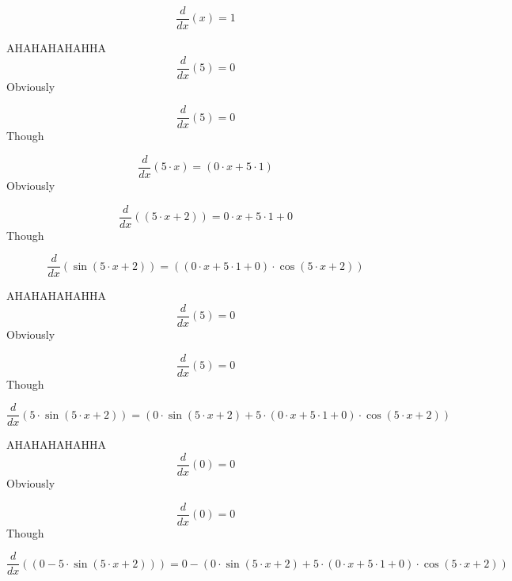 \documentclass[12pt,a4paper]{extreport}
\begin{document}
\begin{dmath*}
    \frac{d}{dx} \left(x\right) = 1
\end{dmath*}

AHAHAHAHAHHA
\begin{dmath*}
    \frac{d}{dx}\left(5\right) =  0 
\end{dmath*}
Obviously


\begin{dmath*}
    \frac{d}{dx} \left(5\right) = 0
\end{dmath*}
Though


\begin{dmath*}
    \frac{d}{dx} \left(5\cdot x\right) = \left(0\cdot x+5\cdot 1\right)
\end{dmath*}
Obviously


\begin{dmath*}
    \frac{d}{dx} \left(\left(5\cdot x+2\right)\right) = 0\cdot x+5\cdot 1+0
\end{dmath*}
Though


\begin{dmath*}
    \frac{d}{dx} \left(\sin \left(5\cdot x+2\right)\right) = \left(\left(0\cdot x+5\cdot 1+0\right)\cdot \cos \left(5\cdot x+2\right)\right)
\end{dmath*}

AHAHAHAHAHHA
\begin{dmath*}
    \frac{d}{dx}\left(5\right) =  0 
\end{dmath*}
Obviously


\begin{dmath*}
    \frac{d}{dx} \left(5\right) = 0
\end{dmath*}
Though


\begin{dmath*}
    \frac{d}{dx} \left(5\cdot \sin \left(5\cdot x+2\right)\right) = \left(0\cdot \sin \left(5\cdot x+2\right)+5\cdot \left(0\cdot x+5\cdot 1+0\right)\cdot \cos \left(5\cdot x+2\right)\right)
\end{dmath*}

AHAHAHAHAHHA
\begin{dmath*}
    \frac{d}{dx}\left(0\right) =  0 
\end{dmath*}
Obviously


\begin{dmath*}
    \frac{d}{dx} \left(0\right) = 0
\end{dmath*}
Though


\begin{dmath*}
    \frac{d}{dx} \left(\left(0-5\cdot \sin \left(5\cdot x+2\right)\right)\right) = 0-\left(0\cdot \sin \left(5\cdot x+2\right)+5\cdot \left(0\cdot x+5\cdot 1+0\right)\cdot \cos \left(5\cdot x+2\right)\right)
\end{dmath*}
\end{document}
